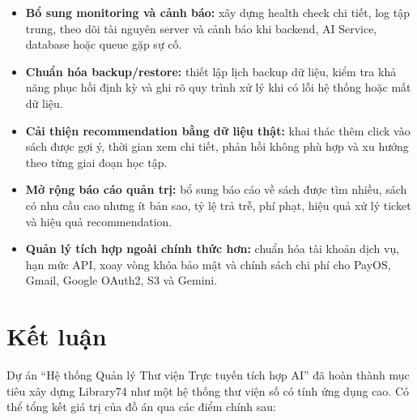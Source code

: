 \begin{itemize}
    \item \textbf{Bổ sung monitoring và cảnh báo:} xây dựng health check chi
    tiết, log tập trung, theo dõi tài nguyên server và cảnh báo khi backend, AI
    Service, database hoặc queue gặp sự cố.

    \item \textbf{Chuẩn hóa backup/restore:} thiết lập lịch backup dữ liệu, kiểm
    tra khả năng phục hồi định kỳ và ghi rõ quy trình xử lý khi có lỗi hệ thống
    hoặc mất dữ liệu.

    \item \textbf{Cải thiện recommendation bằng dữ liệu thật:} khai thác thêm
    click vào sách được gợi ý, thời gian xem chi tiết, phản hồi không phù hợp và
    xu hướng theo từng giai đoạn học tập.

    \item \textbf{Mở rộng báo cáo quản trị:} bổ sung báo cáo về sách được tìm
    nhiều, sách có nhu cầu cao nhưng ít bản sao, tỷ lệ trả trễ, phí phạt, hiệu
    quả xử lý ticket và hiệu quả recommendation.

    \item \textbf{Quản lý tích hợp ngoài chính thức hơn:} chuẩn hóa tài khoản
    dịch vụ, hạn mức API, xoay vòng khóa bảo mật và chính sách chi phí cho PayOS,
    Gmail, Google OAuth2, S3 và Gemini.
\end{itemize}

\section{Kết luận}

Dự án ``Hệ thống Quản lý Thư viện Trực tuyến tích hợp AI'' đã hoàn thành mục
tiêu xây dựng Library74 như một hệ thống thư viện số có tính ứng dụng cao. Có
thể tổng kết giá trị của đồ án qua các điểm chính sau:

